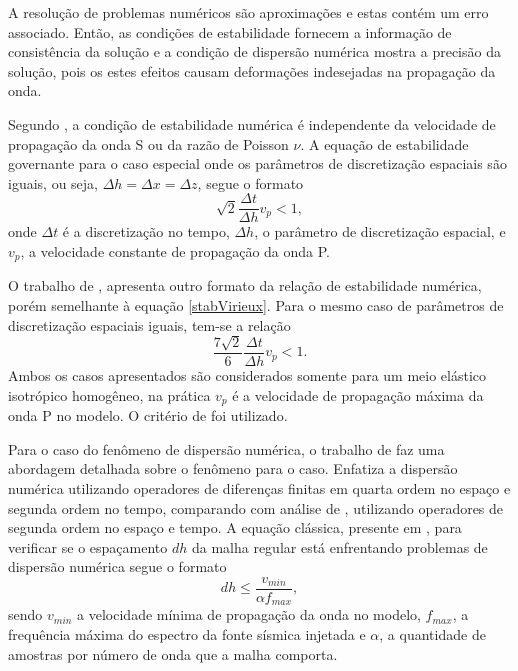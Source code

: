 \documentclass[
	12pt,				%
	openright,			%
	oneside,			%
	a4paper,			%
	english,			%
	brazil				%
	]{abntex2}
\begin{document}
	A resolução de problemas numéricos são aproximações e estas contém um erro associado. Então, as condições de estabilidade fornecem a informação de consistência da solução e a condição de dispersão numérica mostra a precisão da solução, pois os estes efeitos causam deformações indesejadas na propagação da onda.   

	Segundo , a condição de estabilidade numérica é independente da velocidade de propagação da onda S ou da razão de Poisson $\nu$. A equação de estabilidade governante para o caso especial onde os parâmetros de discretização espaciais são iguais, ou seja, $\Delta h = \Delta x = \Delta z$, segue o formato
%	
	\begin{equation}
	 \sqrt{2}\dfrac{\Delta t}{\Delta h}v_p < 1, 
	 \label{stabVirieux}
	\end{equation}
%	
	\noindent onde $\Delta t$ é a discretização no tempo, $\Delta h$, o parâmetro de discretização espacial, e $v_p$, a velocidade constante de propagação da onda P.
	
	O trabalho de , apresenta outro formato da relação de estabilidade numérica, porém semelhante à equação \ref{stabVirieux}. Para o mesmo caso de parâmetros de discretização espaciais iguais, tem-se a relação
%	
	\begin{equation}
		\dfrac{7\sqrt{2}}{6} \dfrac{\Delta t}{\Delta h} v_p < 1. 
	\end{equation}    
%
	\noindent Ambos os casos apresentados são considerados somente para um meio elástico isotrópico homogêneo, na prática $v_p$ é a velocidade de propagação máxima da onda P no modelo. O critério de  foi utilizado.  	
	
	Para o caso do fenômeno de dispersão numérica, o trabalho de  faz uma abordagem detalhada sobre o fenômeno para o caso. Enfatiza a dispersão numérica utilizando operadores de diferenças finitas em quarta ordem no espaço e segunda ordem no tempo, comparando com análise de , utilizando operadores de segunda ordem no espaço e tempo. A equação clássica, presente em , para verificar se o espaçamento $dh$ da malha regular está enfrentando problemas de dispersão numérica segue o formato
%	
	\begin{equation}
		dh \le \dfrac{v_{min}}{\alpha f_{max}},
	\end{equation} 
%	
 	\noindent sendo $v_{min}$ a velocidade mínima de propagação da onda no modelo, $f_{max}$, a frequência máxima do espectro da fonte sísmica injetada e $\alpha$, a quantidade de amostras por número de onda que a malha comporta. 
 	
\end{document}
